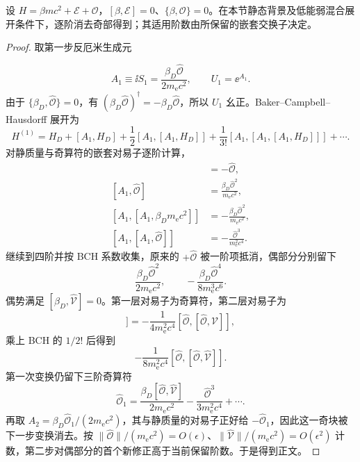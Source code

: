 \begin{proposition}[偶奇算符的二阶块对角化]
设 $H=\beta mc^2+\mathcal E+\mathcal O$，$[\beta,\mathcal E]=0$、$\{\beta,\mathcal O\}=0$。在本节静态背景及低能弱混合展开条件下，逐阶消去奇部得到；其适用阶数由所保留的嵌套交换子决定。
\end{proposition}

\begin{proof}
取第一步反厄米生成元

\begin{equation*}
 A_1\equiv\ii S_1=\frac{\beta_D\hat{\mathcal O}}{2m_{\mathrm e} c^2},
 \qquad U_1=\ee^{A_1}.
\end{equation*}
由于 $\{\beta_D,\hat{\mathcal O}\}=0$，有 $(\beta_D\hat{\mathcal O})^\dagger=-\beta_D\hat{\mathcal O}$，所以 $U_1$ 幺正。Baker--Campbell--Hausdorff 展开为
\begin{equation*}
 H^{(1)}=H_D+[A_1,H_D]
 +\frac12[A_1,[A_1,H_D]]
 +\frac1{3!}[A_1,[A_1,[A_1,H_D]]]+\cdots .
\end{equation*}
对静质量与奇算符的嵌套对易子逐阶计算，
\begin{align*}
 [A_1,\beta_Dm_{\mathrm e} c^2]&=-\hat{\mathcal O},\\
 [A_1,\hat{\mathcal O}]&=\frac{\beta_D\hat{\mathcal O}^2}{m_{\mathrm e} c^2},\\
 [A_1,[A_1,\beta_Dm_{\mathrm e} c^2]]&=-\frac{\beta_D\hat{\mathcal O}^2}{m_{\mathrm e} c^2},\\
 [A_1,[A_1,\hat{\mathcal O}]]&=-\frac{\hat{\mathcal O}^3}{m_{\mathrm e}^2c^4}.
\end{align*}
继续到四阶并按 BCH 系数收集，原来的 $+\hat{\mathcal O}$ 被一阶项抵消，偶部分分别留下
\begin{equation*}
 \frac{\beta_D\hat{\mathcal O}^2}{2m_{\mathrm e} c^2},
 \qquad
 -\frac{\beta_D\hat{\mathcal O}^4}{8m_{\mathrm e}^3c^6}.
\end{equation*}
偶势满足 $[\beta_D,\hat{\mathcal V}]=0$。第一层对易子为奇算符，第二层对易子为
\begin{equation*}
 [A_1,[A_1,\hat{\mathcal V}]]
 =-\frac{1}{4m_{\mathrm e}^2c^4}[\hat{\mathcal O},[\hat{\mathcal O},\hat{\mathcal V}]],
\end{equation*}
乘上 BCH 的 $1/2!$ 后得到
\begin{equation*}
 -\frac{1}{8m_{\mathrm e}^2c^4}[\hat{\mathcal O},[\hat{\mathcal O},\hat{\mathcal V}]].
\end{equation*}
第一次变换仍留下三阶奇算符
\begin{equation*}
 \hat{\mathcal O}_1
 =\frac{\beta_D[\hat{\mathcal O},\hat{\mathcal V}]}{2m_{\mathrm e} c^2}
 -\frac{\hat{\mathcal O}^3}{3m_{\mathrm e}^2c^4}+\cdots .
\end{equation*}
再取 $A_2=\beta_D\hat{\mathcal O}_1/(2m_{\mathrm e} c^2)$，其与静质量的对易子正好给 $-\hat{\mathcal O}_1$，因此这一奇块被下一步变换消去。按 $\|\hat{\mathcal O}\|/(m_{\mathrm e} c^2)=O(\epsilon)$、$\|\hat{\mathcal V}\|/(m_{\mathrm e} c^2)=O(\epsilon^2)$ 计数，第二步对偶部分的首个新修正高于当前保留阶数。于是得到正文。
\end{proof}

